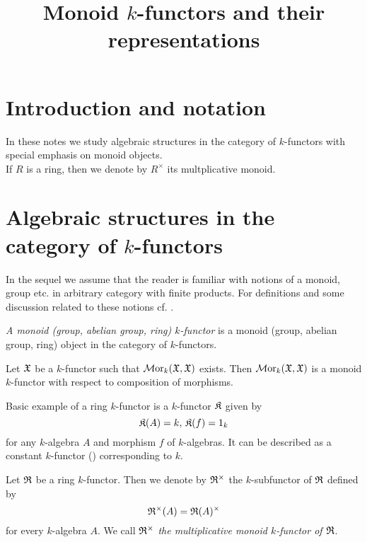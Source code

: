 



\title{Monoid $k$-functors and their representations}
\date{}
\maketitle

\section{Introduction and notation}
\noindent
In these notes we study algebraic structures in the category of $k$-functors with special emphasis on monoid objects.\\
If $R$ is a ring, then we denote by $R^{\times}$ its multplicative monoid.

\section{Algebraic structures in the category of $k$-functors}
\noindent
In the sequel we assume that the reader is familiar with notions of a monoid, group etc. in arbitrary category with finite products. For definitions and some discussion related to these notions cf. {\cite[pages 2-5]{Maclane}}.

\begin{definition}
\textit{A monoid (group, abelian group, ring) $k$-functor} is a monoid (group, abelian group, ring) object in the category of $k$-functors.
\end{definition}

\begin{example}\label{example:endomorphisms_of_k_functor}
Let ${\mathfrak X}$ be a $k$-functor such that $\mathcal{M}\mathrm{or}_k({\mathfrak X},{\mathfrak X})$ exists. Then $\mathcal{M}\mathrm{or}_k({\mathfrak X},{\mathfrak X})$ is a monoid $k$-functor with respect to composition of morphisms.
\end{example}

\begin{example}\label{example:constant_ring_k_functor}
Basic example of a ring $k$-functor is a $k$-functor $\mathfrak{K}$ given by
$${\mathfrak K}(A) = k,\,{\mathfrak K}(f) = 1_k$$
for any $k$-algebra $A$ and morphism $f$ of $k$-algebras. It can be described as a constant $k$-functor ({\cite[page 67]{Maclane}}) corresponding to $k$.
\end{example}

\begin{definition}
Let ${\mathfrak R}$ be a ring $k$-functor. Then we denote by ${\mathfrak R}^{\times}$ the $k$-subfunctor of ${\mathfrak R}$ defined by
$${\mathfrak R}^{\times}(A) = {\mathfrak R}(A)^{\times}$$
for every $k$-algebra $A$. We call ${\mathfrak R}^{\times}$ \textit{the multiplicative monoid $k$-functor of ${\mathfrak R}$}.
\end{definition}

